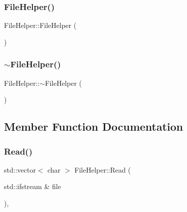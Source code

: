 \subsubsection{\texorpdfstring{File\+Helper()}{FileHelper()}}
{\footnotesize\ttfamily File\+Helper\+::\+File\+Helper (\begin{DoxyParamCaption}{ }\end{DoxyParamCaption})}

\mbox{\label{class_file_helper_afcc083ceafe656253e7698d86809e08e}} 
\subsubsection{\texorpdfstring{$\sim$\+File\+Helper()}{~FileHelper()}}
{\footnotesize\ttfamily File\+Helper\+::$\sim$\+File\+Helper (\begin{DoxyParamCaption}{ }\end{DoxyParamCaption})\hspace{0.3cm}{\ttfamily [virtual]}}



\subsection{Member Function Documentation}
\mbox{\label{class_file_helper_a7406bea168b0b6b887eef6874e432d3c}} 
\subsubsection{\texorpdfstring{Read()}{Read()}}
{\footnotesize\ttfamily std\+::vector$<$ char $>$ File\+Helper\+::\+Read (\begin{DoxyParamCaption}\item[{std\+::ifstream \&}]{file }\end{DoxyParamCaption})\hspace{0.3cm}{\ttfamily [static]}, {\ttfamily [private]}}

\mbox{\label{class_file_helper_a7357684123d99f88563e68fc24448963}} 
